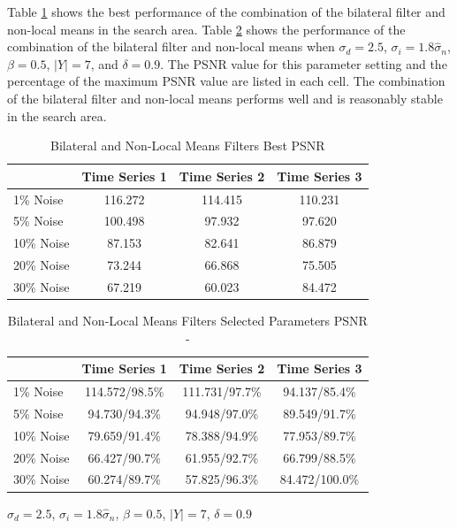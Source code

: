 \documentclass[11pt]{article}
\theoremstyle{definition}
\begin{document}
\begin{itemize}
  Table \ref{bilateralnlmeansbestpsnr} shows the best performance of
  the combination of the bilateral filter and non-local means in the search area.
  Table \ref{bilateralnlmeansselectpsnr} shows the performance of the
  combination of the bilateral filter and non-local means when $\sigma_d = 2.5$,
  $\sigma_i = 1.8 \hat{\sigma}_n$, $\beta = 0.5$, $\lvert Y \rvert =
  7$, and $\delta = 0.9$. The PSNR value for this parameter setting
  and the percentage of the maximum PSNR value are listed in each
  cell. The combination of the bilateral filter and non-local means performs well
  and is reasonably stable in the search area.

\begin{table}[!h]
\small
\begin{center}
\begin{tabular}{lccc}
\hline 
 & Time Series 1 & Time Series 2 & Time Series 3 \\ \hline
1\% Noise & 116.272 & 114.415 & 110.231 \\ \hline
5\% Noise & 100.498 & 97.932 & 97.620 \\ \hline
10\% Noise & 87.153 & 82.641 & 86.879 \\ \hline
20\% Noise & 73.244 & 66.868 & 75.505 \\ \hline
30\% Noise & 67.219 & 60.023 & 84.472 \\ \hline
\end{tabular}
\caption{Bilateral and Non-Local Means Filters Best PSNR}
\label{bilateralnlmeansbestpsnr}
\end{center}
\end{table}

\begin{table}[!h]
\small
\begin{center}
\begin{tabular}{lccc}
\hline 
 & Time Series 1 & Time Series 2 & Time Series 3 \\ \hline
1\% Noise & 114.572/98.5\% & 111.731/97.7\% & 94.137/85.4\% \\ \hline
5\% Noise & 94.730/94.3\% & 94.948/97.0\% & 89.549/91.7\% \\ \hline
10\% Noise & 79.659/91.4\% & 78.388/94.9\% & 77.953/89.7\% \\ \hline
20\% Noise & 66.427/90.7\% & 61.955/92.7\% & 66.799/88.5\% \\ \hline
30\% Noise & 60.274/89.7\% & 57.825/96.3\% & 84.472/100.0\% \\ \hline
\end{tabular}
\caption{Bilateral and Non-Local Means Filters Selected Parameters PSNR -}
$\sigma_d = 2.5$, $\sigma_i = 1.8 \hat{\sigma}_n$, $\beta = 0.5$, $\lvert Y \rvert = 7$, $\delta = 0.9$
\label{bilateralnlmeansselectpsnr}
\end{center}
\end{table}

\end{itemize}
\end{document}
